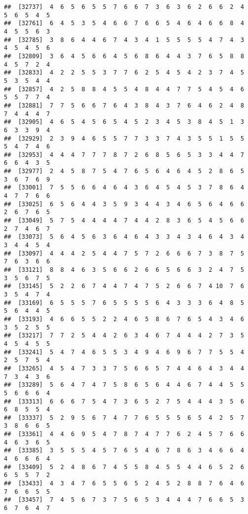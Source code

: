 \documentclass[
]{book}
\begin{document}
\begin{verbatim}
##  [32737]  4  6  5  6  5  5  7  6  6  7  3  6  3  6  2  6  6  2  4  5  6  5  4  5
##  [32761]  6  4  5  3  5  4  6  6  7  6  6  5  4  6  4  6  6  8  4  4  5  5  6  3
##  [32785]  3  8  6  4  4  6  7  4  3  4  1  5  5  5  5  4  7  4  3  4  5  4  5  6
##  [32809]  3  6  4  5  6  6  4  5  6  8  6  4  4  3  7  6  5  8  8  4  5  7  2  4
##  [32833]  4  2  2  5  5  3  7  7  6  2  5  4  5  4  2  3  7  4  5  5  3  5  4  4
##  [32857]  4  2  5  8  8  4  5  5  4  8  4  4  7  7  5  4  5  4  6  5  5  7  7  4
##  [32881]  7  7  5  6  6  7  6  4  3  8  4  3  7  6  4  6  2  4  8  7  4  4  4  7
##  [32905]  4  6  5  4  5  6  5  4  5  2  3  4  5  3  8  4  5  1  3  6  3  3  9  4
##  [32929]  2  3  9  4  6  5  5  7  7  3  3  7  4  3  5  5  1  5  5  5  4  7  4  6
##  [32953]  4  4  4  7  7  7  8  7  2  6  8  5  6  5  3  3  4  4  7  6  6  4  3  5
##  [32977]  2  4  5  8  7  5  4  7  6  5  6  4  6  4  5  2  8  6  5  3  6  7  6  9
##  [33001]  7  5  5  6  6  4  6  4  3  6  4  5  4  5  3  7  8  6  4  4  7  7  6  6
##  [33025]  6  5  6  4  4  3  5  9  3  4  4  3  4  6  5  6  4  6  6  2  6  7  6  5
##  [33049]  5  7  5  4  4  4  4  7  4  4  2  8  3  6  5  4  5  6  6  2  7  4  6  7
##  [33073]  5  6  4  5  6  3  6  4  6  4  3  3  4  3  4  6  4  3  4  3  4  4  5  4
##  [33097]  4  4  4  2  5  4  4  7  5  7  2  6  6  6  7  3  8  7  5  7  6  3  6  6
##  [33121]  8  8  4  6  3  5  6  6  2  6  6  5  6  6  3  2  4  7  5  3  5  6  7  5
##  [33145]  5  2  2  6  7  4  4  7  4  7  5  2  6  6  7  4 10  7  6  3  5  4  7  4
##  [33169]  6  5  5  5  7  6  5  5  5  5  6  4  3  3  3  6  4  8  5  5  6  4  4  5
##  [33193]  4  6  6  5  5  2  2  4  6  5  8  6  7  6  5  4  3  4  6  3  5  2  5  5
##  [33217]  7  7  2  5  4  4  2  6  3  4  6  7  4  4  4  2  7  3  5  4  5  4  5  5
##  [33241]  5  4  7  4  6  5  5  3  4  9  4  6  9  6  7  7  5  5  4  2  5  7  5  4
##  [33265]  4  5  4  7  3  3  7  5  6  6  5  7  4  4  6  4  3  4  4  7  3  4  3  6
##  [33289]  5  6  4  7  4  7  5  8  6  5  6  4  4  6  7  4  4  5  5  5  6  6  6  4
##  [33313]  6  6  6  7  5  4  7  3  6  5  2  7  5  4  4  4  3  5  6  6  8  5  5  4
##  [33337]  5  2  9  5  6  7  4  7  7  6  5  5  5  6  5  4  2  5  7  3  8  6  6  5
##  [33361]  4  4  6  9  5  4  7  8  7  4  7  7  6  2  4  5  7  6  6  4  6  3  6  5
##  [33385]  3  5  5  5  4  5  7  6  5  4  6  7  8  6  3  4  6  6  4  4  6  6  6  4
##  [33409]  5  2  4  8  6  7  4  5  5  8  4  5  5  4  4  6  5  2  6  6  5  5  7  2
##  [33433]  4  3  4  7  6  5  5  6  5  2  4  5  2  8  8  7  6  4  6  7  6  6  5  5
##  [33457]  7  4  5  6  7  3  7  5  6  5  3  4  4  4  7  6  6  5  3  6  7  6  4  7

\end{verbatim}
\end{document}
